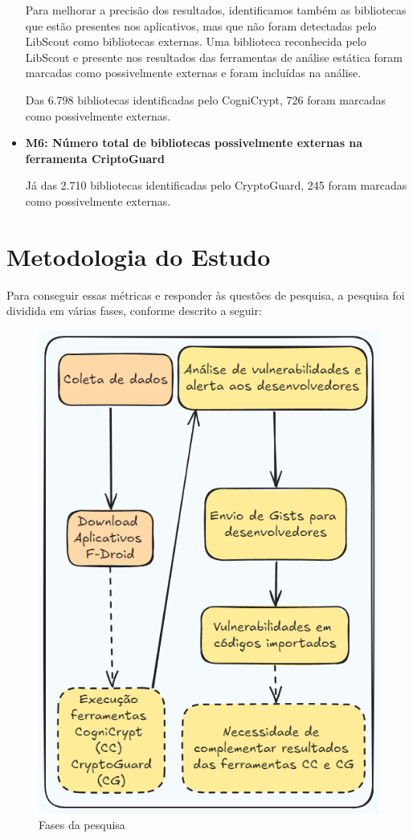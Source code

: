 \begin{itemize}
Para melhorar a precisão dos resultados, identificamos também as bibliotecas que estão presentes nos aplicativos, mas que não foram detectadas pelo LibScout como bibliotecas externas. Uma biblioteca reconhecida pelo LibScout e presente nos resultados das ferramentas de análise estática foram marcadas como possivelmente externas e foram incluídas na análise.

Das 6.798 bibliotecas identificadas pelo CogniCrypt, 726 foram marcadas como possivelmente externas.

\item \textbf{M6: Número total de bibliotecas possivelmente externas na ferramenta CriptoGuard} \

Já das 2.710 bibliotecas identificadas pelo CryptoGuard, 245 foram marcadas como possivelmente externas.


\end{itemize}

\section{Metodologia do Estudo}

Para conseguir essas métricas e responder às questões de pesquisa, a pesquisa foi dividida em várias fases, conforme descrito a seguir:

\begin{figure}[!ht]
  \centering
  \includegraphics[scale=0.4]{img/research_steps1.png}
  \caption{Fases da pesquisa}
  \label{img: research_steps}
\end{figure}


